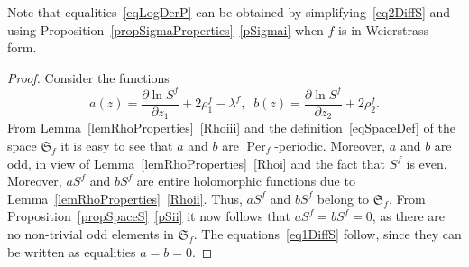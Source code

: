 \documentclass{amsart}
\numberwithin{equation}{section}
\theoremstyle{definition}
\theoremstyle{remark}
\DeclareMathOperator{\Per}{Per}
\begin{document}
	Note that equalities~\eqref{eqLogDerP} can be obtained by simplifying~\eqref{eq2DiffS} and using Proposition~\ref{propSigmaProperties}~\ref{pSigmai} when $f$ is in Weierstrass form.
	\begin{proof}
		Consider the functions 
		\[
		a(z) = \frac{\partial \ln S^f}{\partial z_1} + 2\rho_1^f - \lambda^f,\;\;b(z) = \frac{\partial \ln S^f}{\partial z_2} + 2\rho_2^f.
		\]
		From Lemma~\ref{lemRhoProperties}~\ref{Rhoiii} and the definition~\eqref{eqSpaceDef} of the space $\mathfrak S_f$ it is easy to see that $a$ and $b$ are $\Per_f$-periodic. Moreover, $a$ and $b$ are odd, in view of Lemma~\ref{lemRhoProperties}~\ref{Rhoi} and the fact that $S^f$ is even. Moreover, $aS^f$ and $bS^f$ are entire holomorphic functions due to Lemma~\ref{lemRhoProperties}~\ref{Rhoii}. Thus, $aS^f$ and $bS^f$ belong to $\mathfrak S_f$. From Proposition~\ref{propSpaceS}~\ref{pSii} it now follows that $aS^f = bS^f = 0$, as there are no non-trivial odd elements in $\mathfrak S_f$. The equations~\eqref{eq1DiffS} follow, since they can be written as equalities $a = b = 0$.
		

\end{proof}
\end{document}
